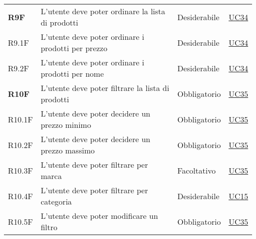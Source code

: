 \begin{center}
\begin{longtable}[!h]{p{50px} p{245px} p{75px} p{50px}}
        \textbf{R9F}                          & L'utente deve poter ordinare la lista di prodotti                                                                                                   & Desiderabile             & \hyperref[sec:UC34]{UC34}                      \\
        R9.1F                                 & L'utente deve poter ordinare i prodotti per prezzo                                                                                                  & Desiderabile             & \hyperref[sec:UC34]{UC34}                      \\
        R9.2F                                 & L'utente deve poter ordinare i prodotti per nome                                                                                                    & Desiderabile             & \hyperref[sec:UC34]{UC34}                      \\
        \textbf{R10F}                         & L'utente deve poter filtrare la lista di prodotti                                                                                                   & Obbligatorio             & \hyperref[sec:UC35]{UC35}                      \\
        R10.1F                                & L'utente deve poter decidere un prezzo minimo                                                                                                       & Obbligatorio             & \hyperref[sec:UC35]{UC35}                      \\
        R10.2F                                & L'utente deve poter decidere un prezzo massimo                                                                                                      & Obbligatorio             & \hyperref[sec:UC35]{UC35}                      \\
        R10.3F                                & L'utente deve poter filtrare per marca                                                                                                              & Facoltativo              & \hyperref[sec:UC35]{UC35}                      \\
        R10.4F                                & L'utente deve poter filtrare per categoria                                                                                                          & Desiderabile             & \hyperref[sec:UC15]{UC15}                      \\
        R10.5F                                & L'utente deve poter modificare un filtro                                                                                                            & Obbligatorio             & \hyperref[sec:UC35]{UC35}                      \\

\end{longtable}
\end{center}
